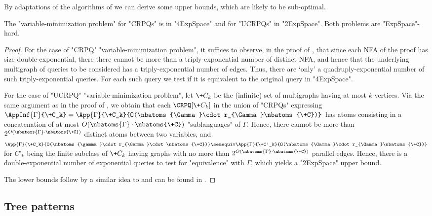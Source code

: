 By adaptations of the algorithms of  we can derive some upper bounds, which are likely to be sub-optimal.
\begin{theorem}
  The "variable-minimization problem" for "CRPQs" is in "4ExpSpace" and for "UCRPQs" in "2ExpSpace". Both problems are "ExpSpace"-hard.
\end{theorem}

\begin{proof}
  For the case of "CRPQ" "variable-minimization problem", it suffices to observe, in the proof of , that since each NFA of the proof has size double-exponential, there there cannot be more than a triply-exponential number of distinct NFA, and hence that the underlying multigraph of queries to be considered has a triply-exponential number of edges. Thus, there are `only' a quadruply-exponential number of such triply-exponential queries. For each such query we test if it is equivalent to the original query in "4ExpSpace".

  For the case of "UCRPQ" "variable-minimization problem", let $\+C_k$ be the (infinite) set of multigraphs having at most $k$ vertices. Via the same argument as in the proof of , 
  we obtain that each $\CRPQ[\+C_k]$ in the union of "CRPQs" expressing
  $\AppInf{\Gamma}{\+C_k}=\App{\Gamma}{\+C_k}{O(\nbatoms{\Gamma}\cdot r_{\Gamma}\nbatoms{\+C})}$
  has atoms consisting in a concatenation of
  at most $O(\nbatoms{\Gamma}\cdot\nbatoms{\+C})$ "sublanguages" of $\Gamma$. Hence, there cannot be more than $2^{O(\nbatoms{\Gamma}\cdot\nbatoms{\+C})}$ distinct atoms between two variables, and $\App{\Gamma}{\+C_k}{O(\nbatoms{\gamma}\cdot r_{\Gamma}\cdot \nbatoms{\+C})} \semequiv \App{\Gamma}{\+C'_k}{O(\nbatoms{\Gamma}\cdot r_{\Gamma}\nbatoms{\+C})}$ for $C'_k$ being the finite subclass of $\+C_k$ having graphs with no more than $2^{O(\nbatoms{\Gamma}\cdot\nbatoms{\+C})}$ parallel edges.
  Hence, there is a double-exponential number of exponential queries to test for "equivalence" with $\Gamma$, which yields a "2ExpSpace" upper bound.


  The lower bounds follow by a similar idea to  and can be found in .
\end{proof}


\subsection{Tree patterns}
\AP\label{sec:apdx-tree-patterns}

